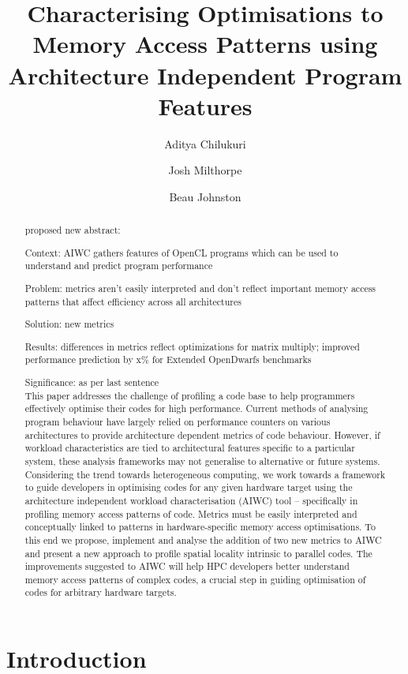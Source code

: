 \documentclass[review=false, sigchi]{acmart}
\title[Architecture Independent Memory Access Pattern Analysis]{Characterising Optimisations to Memory Access Patterns using Architecture Independent Program Features}
\author{Aditya Chilukuri}
\affiliation{%
	\institution{Australian National University}}
\author{Josh Milthorpe}
\affiliation{%
	\institution{Australian National University}}
\author{Beau Johnston}
\affiliation{%
	\institution{Australian National University}}
\begin{document}
	\begin{abstract}
	proposed new abstract: 
		
	Context: AIWC gathers features of OpenCL programs which can be used to understand and predict program performance
	
	Problem: metrics aren't easily interpreted and don't reflect important memory access patterns that affect efficiency across all architectures
	
	Solution: new metrics
	
	Results: differences in metrics reflect optimizations for matrix multiply; improved performance prediction by x\% for Extended OpenDwarfs benchmarks
	
	Significance: as per last sentence\\
		
	This paper addresses the challenge of profiling a code base to help programmers effectively optimise their codes for high performance.
	Current methods of analysing program behaviour have largely relied on performance counters on various architectures to provide architecture dependent metrics of code behaviour. 
	However, if workload characteristics are tied to architectural features specific to a particular system, these analysis frameworks may not generalise to alternative or future systems.
	Considering the trend towards heterogeneous computing, we work towards a framework to guide developers in optimising codes for any given hardware target using the architecture independent workload characterisation (AIWC) tool -- specifically in profiling memory access patterns of code. 
	Metrics must be easily interpreted and conceptually linked to patterns in hardware-specific memory access optimisations.
	To this end we propose, implement and analyse the addition of two new metrics to AIWC and present a new approach to profile spatial locality intrinsic to parallel codes.
	The improvements suggested to AIWC will help HPC developers better understand memory access patterns of complex codes, a crucial step in guiding optimisation of codes for arbitrary hardware targets.
	\end{abstract}
	\maketitle	
	
	\section{Introduction}
	
\end{document}
